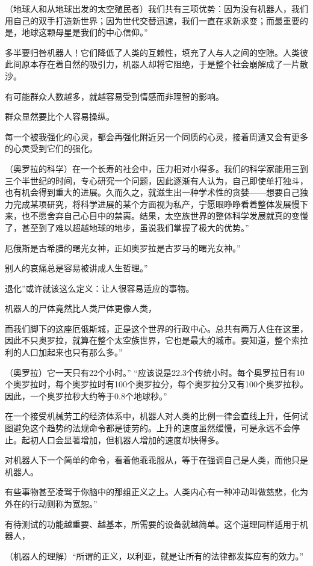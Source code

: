 （地球人和从地球出发的太空殖民者）我们共有三项优势：因为没有机器人，我们用自己的双手打造新世界；因为世代交替迅速，我们一直在求新求变；而最重要的是，地球这颗母星是我们的中心信仰。”

多半要归咎机器人！它们降低了人类的互赖性，填充了人与人之间的空隙。人类彼此间原本存在着自然的吸引力，机器人却将它阻绝，于是整个社会崩解成了一片散沙。

有可能群众人数越多，就越容易受到情感而非理智的影响。

群众显然要比个人容易操纵。

每一个被我强化的心灵，都会再强化附近另一个同质的心灵，接着周遭又会有更多的心灵受到它们的强化。

（奥罗拉的科学）在一个长寿的社会中，压力相对小得多。我们的科学家能用三到三个半世纪的时间，专心研究一个问题，因此逐渐有人认为，自己即使单打独斗，也有机会得到重大的进展。久而久之，就滋生出一种学术性的贪婪——想要自己独力完成某项研究，将科学进展的某个方面视为私产，宁愿眼睁睁看着整体发展慢下来，也不愿舍弃自己心目中的禁脔。结果，太空族世界的整体科学发展就真的变慢了，甚至到了难以超越地球的地步，虽说我们掌握了极大的优势。”

厄俄斯是古希腊的曙光女神，正如奥罗拉是古罗马的曙光女神。”

别人的哀痛总是容易被讲成人生哲理。”

退化”或许就该这么定义：让人很容易适应的事物。

机器人的尸体竟然比人类尸体更像人类，

而我们脚下的这座厄俄斯城，正是这个世界的行政中心。总共有两万人住在这里，因此不只奥罗拉，就算在整个太空族世界，它也是最大的城市。要知道，整个索拉利的人口加起来也只有那么多。”

（奥罗拉）它一天只有22个小时。” “应该说是22.3个传统小时。每个奥罗拉日有10个奥罗拉时，每个奥罗拉时有100个奥罗拉分，每个奥罗拉分又有100个奥罗拉秒。因此，一个奥罗拉秒大约等于0.8个地球秒。”

在一个接受机械劳工的经济体系中，机器人对人类的比例一律会直线上升，任何试图避免这个趋势的法规命令都是徒劳的。上升的速度虽然缓慢，可是永远不会停止。起初人口会显著增加，但机器人增加的速度却快得多。

对机器人下一个简单的命令，看着他乖乖服从，等于在强调自己是人类，而他只是机器人。

有些事物甚至凌驾于你脑中的那组正义之上。人类内心有一种冲动叫做慈悲，化为外在的行动则称为宽恕。”

有待测试的功能越重要、越基本，所需要的设备就越简单。这个道理同样适用于机器人，

（机器人的理解）“所谓的正义，以利亚，就是让所有的法律都发挥应有的效力。”

